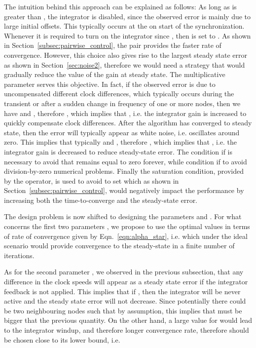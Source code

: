 \documentclass[english,a4paper,10pt,final]{article}
\numberwithin{equation}{section}
\numberwithin{figure}{section}
\begin{document}
The intuition behind this approach can be explained as follows: As long as  is greater than , the integrator is disabled, since the observed error is mainly due to large initial offsets. This typically occurs at the on start of the synchronization. Whenever it is required to turn on the integrator since , then  is set to . As shown in Section~\ref{subsec:pairwise_control}, the pair  provides the faster rate of convergence. However, this choice also gives rise to the largest steady state error as shown in Section~\ref{sec:noise2}, therefore we would need a strategy that would gradually reduce the value of the gain  at steady state. The multiplicative parameter  serves this objective. In fact, if the observed error  is due to uncompensated different clock differences, which typically occurs during the transient or after a sudden change in frequency of one or more nodes, then we have  and , therefore , which implies that , i.e. the integrator gain is increased to quickly compensate clock differences. After the algorithm has converged to steady state, then the error will typically appear as white noise, i.e.  oscillates around zero. This implies that typically  and , therefore , which implies that , i.e. the integrator gain is decreased to reduce steady-state error. The condition  if  is necessary to avoid that  remains equal to zero forever, while condition  if  to avoid division-by-zero numerical problems. Finally the saturation condition, provided by the  operator, is used to avoid to set  which as shown in Section~\ref{subsec:pairwise_control}, would negatively impact the performance by increasing both the time-to-converge and the steady-state error.  




The design problem is now shifted to designing the parameters  and . For what concerns the first two parameters , we propose to use the optimal values in terms of rate of convergence given by Eqn.~\eqref{eqn:alpha_star}, i.e.
 which under the ideal scenario would provide convergence to the steady-state in a finite number of iterations. 

As for the second parameter , we observed in the previous subsection, that any difference in the clock speeds will appear as a steady state error  if the integrator feedback is not applied. This implies that if , then the integrator will be never active and the steady state error will not decrease. Since potentially there could be two neighbouring nodes such that  by assumption, this implies that   must be bigger that the previous quantity. On the other hand, a large value for  would lead to the integrator windup, and therefore longer convergence rate, therefore  should be chosen close to its lower bound, i.e.
\end{document}

